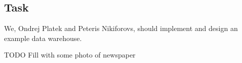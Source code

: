 \addtocounter{chapter}{1}
\subsection*{Task} %
\label{sub:Task}
We, Ondrej Platek and Peteris Nikiforovs, should implement and design an example data warehouse.

TODO Fill with some photo of newspaper
